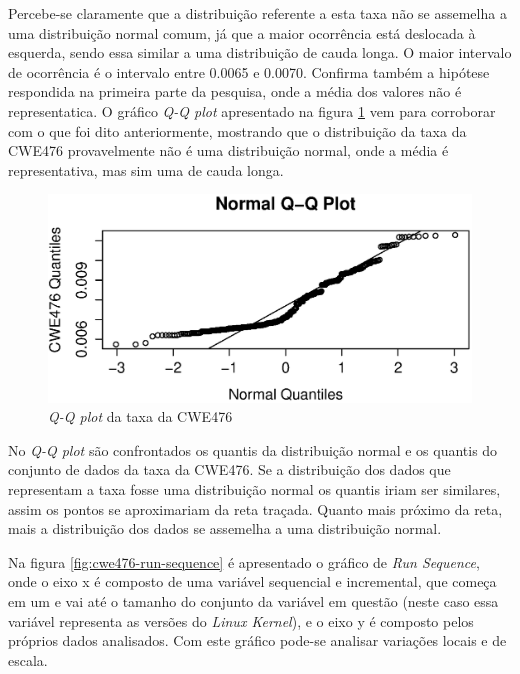 Percebe-se claramente que a distribuição referente a esta taxa não se assemelha
a uma distribuição normal comum, já que a maior ocorrência está deslocada à
esquerda, sendo essa similar a uma distribuição de cauda longa. O maior
intervalo de ocorrência é o intervalo entre 0.0065 e 0.0070. Confirma também a
hipótese respondida na primeira parte da pesquisa, onde a média dos valores não
é representatica. O gráfico \textit{Q-Q plot} apresentado na figura
\ref{fig:cwe476-qq-plot} vem para corroborar com o que foi dito anteriormente,
mostrando que o distribuição da taxa da CWE476 provavelmente não é uma
distribuição normal, onde a média é representativa, mas sim uma de cauda
longa.

\begin{figure}[h]
  \centering
  \includegraphics[width=1.0\textwidth]
      {figuras/cwe476-qq-plot.eps}
      \caption{\textit{Q-Q plot} da taxa da CWE476}
      \label{fig:cwe476-qq-plot}
\end{figure}

No \textit{Q-Q plot} são confrontados os quantis da distribuição normal e os
quantis do conjunto de dados da taxa da CWE476. Se a distribuição dos dados que
representam a taxa fosse uma distribuição normal os quantis iriam ser similares,
assim os pontos se aproximariam da reta traçada. Quanto mais próximo da reta,
mais a distribuição dos dados se assemelha a uma distribuição normal.

Na figura \ref{fig:cwe476-run-sequence} é apresentado o gráfico de \textit{Run
Sequence}, onde o eixo x é composto de uma variável sequencial e incremental,
que começa em um e vai até o tamanho do conjunto da variável em questão (neste
caso essa variável representa as versões do \textit{Linux Kernel}), e o
eixo y é composto pelos próprios dados analisados. Com este gráfico pode-se
analisar variações locais e de escala.

